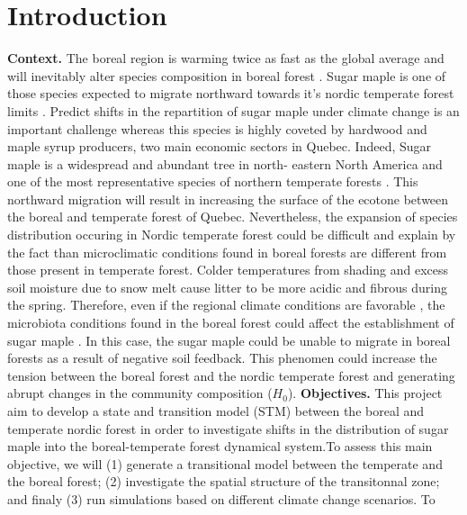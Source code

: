 


\newpage
\setcounter{page}{1}

\section{Introduction}

\textbf{Context.}  The boreal region is warming twice as fast as the global
average and will inevitably alter species composition in boreal forest
\cite{Scheffer2012,Hughes2000}.  Sugar maple is one of those species expected
to migrate northward towards it's nordic temperate forest limits
\cite{McKENNEY2007,Goldblum2005}. Predict shifts in the repartition of sugar
maple under climate change is an important challenge whereas this species is
highly coveted by hardwood and maple syrup producers, two main economic
sectors in Quebec. Indeed, Sugar maple is a widespread and abundant tree in
north- eastern North America and one of the most representative species of
northern temperate forests \cite{Graignic2013,Messaoud2007,Kellman2004}. This
northward migration will result in increasing the surface of the ecotone
between the boreal and temperate forest of Quebec. Nevertheless, the expansion
of species distribution occuring in Nordic temperate forest could be difficult
and explain by the fact than microclimatic conditions found in boreal forests
are different from those present in temperate forest. Colder temperatures from
shading and excess soil moisture due to snow melt cause litter to be more
acidic and fibrous during the spring. Therefore, even if the regional climate
conditions are favorable \cite{Kellman2004}, the microbiota conditions found
in the boreal forest could affect the establishment of sugar maple
\cite{Kellman2004,Moore2008,DeFrenne2013,Barras1998}. In this case, the sugar
maple could be unable to migrate in boreal forests as a result of negative
soil feedback. This phenomen could increase the tension between the boreal
forest and the nordic temperate forest and generating abrupt changes in the
community composition (\textbf{$H_0$}). \textbf{Objectives.} This project aim to develop
a state and transition model (STM) between the boreal and temperate nordic
forest in order to investigate shifts in the distribution of sugar maple into
the boreal-temperate forest dynamical system.To assess this main objective, we
will (1) generate a transitional model between the temperate and the boreal
forest; (2) investigate the spatial structure of the transitonnal zone; and
finaly (3) run simulations based on different climate change scenarios. To
